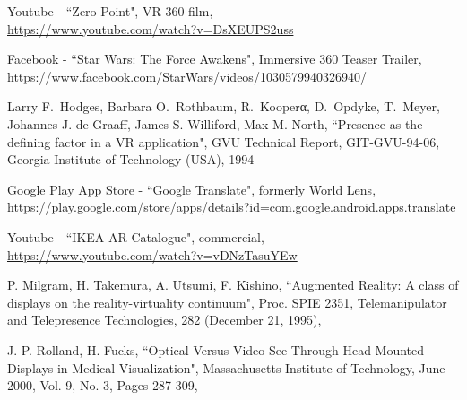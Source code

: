 

\begin{thebibliography}{99} %

Youtube - ``Zero Point", VR 360 film, \\ \href{https://www.youtube.com/watch?v=DsXEUPS2uss}{https://www.youtube.com/watch?v=DsXEUPS2uss}

Facebook - ``Star Wars: The Force Awakens", Immersive 360 Teaser Trailer, \\ \href{https://www.facebook.com/StarWars/videos/1030579940326940/}{https://www.facebook.com/StarWars/videos/1030579940326940/}

Larry F.~Hodges, Barbara O.~Rothbaum, R.~Kooperα,
D.~Opdyke, T.~Meyer, Johannes J. de Graaff,
James S. Williford, Max M. North,
``Presence as the defining factor in a VR application",
GVU Technical Report, GIT-GVU-94-06,
Georgia Institute of Technology (USA), 1994

Google Play App Store - ``Google Translate", formerly World Lens, \\ \href{https://play.google.com/store/apps/details?id=com.google.android.apps.translate}{https://play.google.com/store/apps/details?id=com.google.android.apps.translate}

Youtube - ``IKEA AR Catalogue", commercial, \\ \href{https://www.youtube.com/watch?v=vDNzTasuYEw}{https://www.youtube.com/watch?v=vDNzTasuYEw}



P. Milgram, H. Takemura, A. Utsumi, F. Kishino,
``Augmented Reality: A class of displays on the reality-virtuality continuum",
Proc. SPIE 2351, Telemanipulator and Telepresence Technologies, 282 (December 21, 1995), 

J. P. Rolland, H. Fucks,
``Optical Versus Video See-Through Head-Mounted Displays in Medical Visualization",
Massachusetts Institute of Technology, June 2000, Vol. 9, No. 3, Pages 287-309,


\end{thebibliography}
